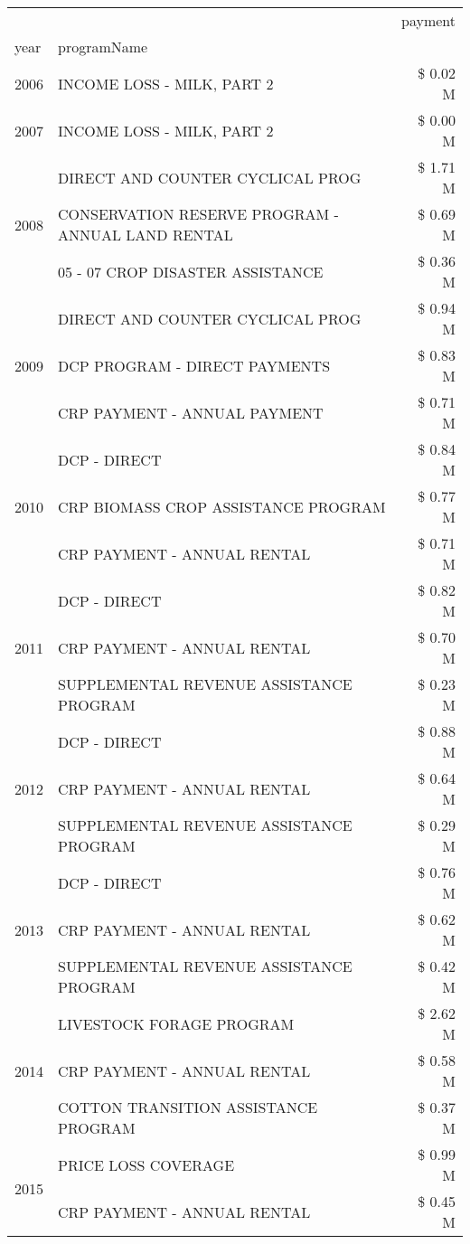 \begin{tabular}{llr}
\toprule
 &  & payment \\
year & programName &  \\
\midrule
2006 & INCOME LOSS - MILK, PART 2 & \$ 0.02 M \\
\cline{1-3}
2007 & INCOME LOSS - MILK, PART 2 & \$ 0.00 M \\
\cline{1-3}
\multirow[t]{3}{*}{2008} & DIRECT AND COUNTER CYCLICAL PROG & \$ 1.71 M \\
 & CONSERVATION RESERVE PROGRAM - ANNUAL LAND RENTAL & \$ 0.69 M \\
 & 05 - 07 CROP DISASTER ASSISTANCE & \$ 0.36 M \\
\cline{1-3}
\multirow[t]{3}{*}{2009} & DIRECT AND COUNTER CYCLICAL PROG & \$ 0.94 M \\
 & DCP PROGRAM - DIRECT PAYMENTS & \$ 0.83 M \\
 & CRP PAYMENT - ANNUAL PAYMENT & \$ 0.71 M \\
\cline{1-3}
\multirow[t]{3}{*}{2010} & DCP - DIRECT & \$ 0.84 M \\
 & CRP BIOMASS CROP ASSISTANCE PROGRAM & \$ 0.77 M \\
 & CRP PAYMENT - ANNUAL RENTAL & \$ 0.71 M \\
\cline{1-3}
\multirow[t]{3}{*}{2011} & DCP - DIRECT & \$ 0.82 M \\
 & CRP PAYMENT - ANNUAL RENTAL & \$ 0.70 M \\
 & SUPPLEMENTAL REVENUE ASSISTANCE PROGRAM & \$ 0.23 M \\
\cline{1-3}
\multirow[t]{3}{*}{2012} & DCP - DIRECT & \$ 0.88 M \\
 & CRP PAYMENT - ANNUAL RENTAL & \$ 0.64 M \\
 & SUPPLEMENTAL REVENUE ASSISTANCE PROGRAM & \$ 0.29 M \\
\cline{1-3}
\multirow[t]{3}{*}{2013} & DCP - DIRECT & \$ 0.76 M \\
 & CRP PAYMENT - ANNUAL RENTAL & \$ 0.62 M \\
 & SUPPLEMENTAL REVENUE ASSISTANCE PROGRAM & \$ 0.42 M \\
\cline{1-3}
\multirow[t]{3}{*}{2014} & LIVESTOCK FORAGE PROGRAM & \$ 2.62 M \\
 & CRP PAYMENT - ANNUAL RENTAL & \$ 0.58 M \\
 & COTTON TRANSITION ASSISTANCE PROGRAM & \$ 0.37 M \\
\cline{1-3}
\multirow[t]{3}{*}{2015} & PRICE LOSS COVERAGE & \$ 0.99 M \\
 & CRP PAYMENT - ANNUAL RENTAL & \$ 0.45 M \\

\end{tabular}
